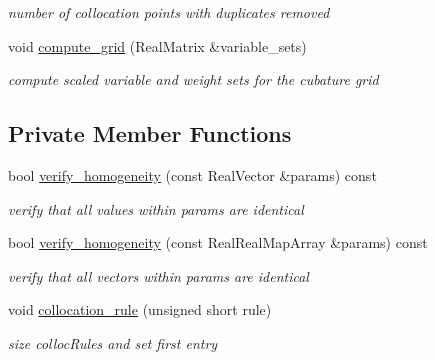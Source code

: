 \begin{DoxyCompactItemize}
\begin{DoxyCompactList}\small\item\em number of collocation points with duplicates removed \end{DoxyCompactList}\item 
void \hyperlink{classPecos_1_1CubatureDriver_a66d564a1e3e1b33220a43d2e2629aace}{compute\+\_\+grid} (Real\+Matrix \&variable\+\_\+sets)\label{classPecos_1_1CubatureDriver_a66d564a1e3e1b33220a43d2e2629aace}

\begin{DoxyCompactList}\small\item\em compute scaled variable and weight sets for the cubature grid \end{DoxyCompactList}\end{DoxyCompactItemize}
\subsection*{Private Member Functions}
\begin{DoxyCompactItemize}
\item 
bool \hyperlink{classPecos_1_1CubatureDriver_a2f98c02b4c3e1f3253cdec894890bf63}{verify\+\_\+homogeneity} (const Real\+Vector \&params) const \label{classPecos_1_1CubatureDriver_a2f98c02b4c3e1f3253cdec894890bf63}

\begin{DoxyCompactList}\small\item\em verify that all values within params are identical \end{DoxyCompactList}\item 
bool \hyperlink{classPecos_1_1CubatureDriver_af390abf13e45e5633560edce5035c96b}{verify\+\_\+homogeneity} (const Real\+Real\+Map\+Array \&params) const \label{classPecos_1_1CubatureDriver_af390abf13e45e5633560edce5035c96b}

\begin{DoxyCompactList}\small\item\em verify that all vectors within params are identical \end{DoxyCompactList}\item 
void \hyperlink{classPecos_1_1CubatureDriver_a3ffbf2daf7cd6623695e749bf6a7224b}{collocation\+\_\+rule} (unsigned short rule)\label{classPecos_1_1CubatureDriver_a3ffbf2daf7cd6623695e749bf6a7224b}

\begin{DoxyCompactList}\small\item\em size colloc\+Rules and set first entry \end{DoxyCompactList}\end{DoxyCompactItemize}
